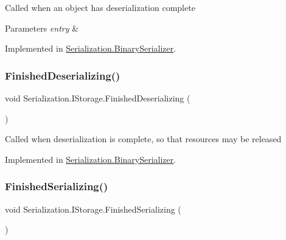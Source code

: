 Called when an object has deserialization complete 


\begin{DoxyParams}{Parameters}
{\em entry} & \\
\hline
\end{DoxyParams}


Implemented in \hyperlink{class_serialization_1_1_binary_serializer_ad89d25a0b56c1b568f6696ab8d04d10b}{Serialization.\+Binary\+Serializer}.

\mbox{\label{interface_serialization_1_1_i_storage_affc5c4e5bc5efaf0f1840943358b6bc9}} 
\subsubsection{\texorpdfstring{Finished\+Deserializing()}{FinishedDeserializing()}}
{\footnotesize\ttfamily void Serialization.\+I\+Storage.\+Finished\+Deserializing (\begin{DoxyParamCaption}{ }\end{DoxyParamCaption})}



Called when deserialization is complete, so that resources may be released 



Implemented in \hyperlink{class_serialization_1_1_binary_serializer_af70f7fb26c0b41d0f1126634df2de03a}{Serialization.\+Binary\+Serializer}.

\mbox{\label{interface_serialization_1_1_i_storage_a5a9811117c5fba81ff98854cfa2c48e1}} 
\subsubsection{\texorpdfstring{Finished\+Serializing()}{FinishedSerializing()}}
{\footnotesize\ttfamily void Serialization.\+I\+Storage.\+Finished\+Serializing (\begin{DoxyParamCaption}{ }\end{DoxyParamCaption})}



